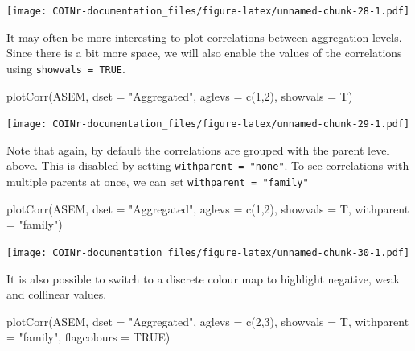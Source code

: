 \documentclass[
]{book}
\newenvironment{Shaded}{\begin{snugshade}}{\end{snugshade}}
\newcommand{\AttributeTok}[1]{\textcolor[rgb]{0.77,0.63,0.00}{#1}}
\newcommand{\ConstantTok}[1]{\textcolor[rgb]{0.00,0.00,0.00}{#1}}
\newcommand{\DecValTok}[1]{\textcolor[rgb]{0.00,0.00,0.81}{#1}}
\newcommand{\FunctionTok}[1]{\textcolor[rgb]{0.00,0.00,0.00}{#1}}
\newcommand{\NormalTok}[1]{#1}
\newcommand{\StringTok}[1]{\textcolor[rgb]{0.31,0.60,0.02}{#1}}
\begin{document}
\texttt{[image: COINr-documentation\_files/figure-latex/unnamed-chunk-28-1.pdf]}

It may often be more interesting to plot correlations between aggregation levels. Since there is a bit more space, we will also enable the values of the correlations using \texttt{showvals\ =\ TRUE}.

\begin{Shaded}
\begin{Highlighting}[]
\FunctionTok{plotCorr}\NormalTok{(ASEM, }\AttributeTok{dset =} \StringTok{"Aggregated"}\NormalTok{, }\AttributeTok{aglevs =} \FunctionTok{c}\NormalTok{(}\DecValTok{1}\NormalTok{,}\DecValTok{2}\NormalTok{), }\AttributeTok{showvals =}\NormalTok{ T)}
\end{Highlighting}
\end{Shaded}

\texttt{[image: COINr-documentation\_files/figure-latex/unnamed-chunk-29-1.pdf]}

Note that again, by default the correlations are grouped with the parent level above. This is disabled by setting \texttt{withparent\ =\ "none"}. To see correlations with multiple parents at once, we can set \texttt{withparent\ =\ "family"}

\begin{Shaded}
\begin{Highlighting}[]
\FunctionTok{plotCorr}\NormalTok{(ASEM, }\AttributeTok{dset =} \StringTok{"Aggregated"}\NormalTok{, }\AttributeTok{aglevs =} \FunctionTok{c}\NormalTok{(}\DecValTok{1}\NormalTok{,}\DecValTok{2}\NormalTok{), }\AttributeTok{showvals =}\NormalTok{ T, }\AttributeTok{withparent =} \StringTok{"family"}\NormalTok{)}
\end{Highlighting}
\end{Shaded}

\texttt{[image: COINr-documentation\_files/figure-latex/unnamed-chunk-30-1.pdf]}

It is also possible to switch to a discrete colour map to highlight negative, weak and collinear values.

\begin{Shaded}
\begin{Highlighting}[]
\FunctionTok{plotCorr}\NormalTok{(ASEM, }\AttributeTok{dset =} \StringTok{"Aggregated"}\NormalTok{, }\AttributeTok{aglevs =} \FunctionTok{c}\NormalTok{(}\DecValTok{2}\NormalTok{,}\DecValTok{3}\NormalTok{), }\AttributeTok{showvals =}\NormalTok{ T, }\AttributeTok{withparent =} \StringTok{"family"}\NormalTok{,}
         \AttributeTok{flagcolours =} \ConstantTok{TRUE}\NormalTok{)}
\end{Highlighting}
\end{Shaded}
\end{document}
